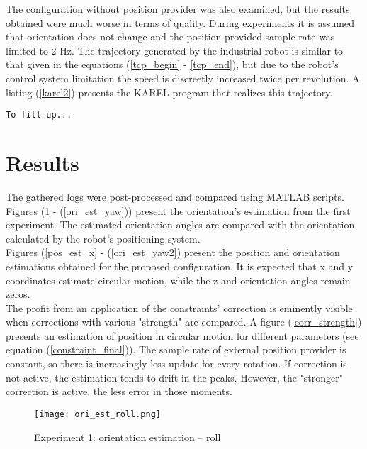The configuration without position provider was also examined, but the results obtained were much worse in terms of quality. During experiments it is assumed that orientation does not change and the position provided sample rate was limited to 2 Hz. The trajectory generated by the industrial robot is similar to that given in the equations (\ref{tcp_begin} - \ref{tcp_end}), but due to the robot's control system limitation the speed is discreetly increased twice per revolution. A listing (\ref{karel2}) presents the KAREL program that realizes this trajectory.

\begin{lstlisting}[caption={The KAREL program realizing a circular motion}, captionpos=b, label=karel2]
	To fill up...
\end{lstlisting}

\section{Results}

The gathered logs were post-processed and compared using MATLAB scripts. Figures (\ref{ori_est_roll} - (\ref{ori_est_yaw})) present the orientation's estimation from the first experiment. The estimated orientation angles are compared with the orientation calculated by the robot's positioning system.\\

Figures (\ref{pos_est_x} - (\ref{ori_est_yaw2}) present the position and orientation estimations obtained for the proposed configuration. It is expected that x and y coordinates estimate circular motion, while the z and orientation angles remain zeros.\\

The profit from an application of the constraints' correction is eminently visible when corrections with various "strength" are compared.
A figure (\ref{corr_strength}) presents an estimation of position in circular motion for different parameters (see equation (\ref{constraint_final})). The sample rate of external position provider is constant, so there is increasingly less update for every rotation. If correction is not active, the estimation tends to drift in the peaks. However, the "stronger" correction is active, the less error in those moments.


\begin{figure}[p]
	\centering
	\texttt{[image: ori\_est\_roll.png]}
	\caption{Experiment 1: orientation estimation -- roll}
	\label{ori_est_roll}
\end{figure}

